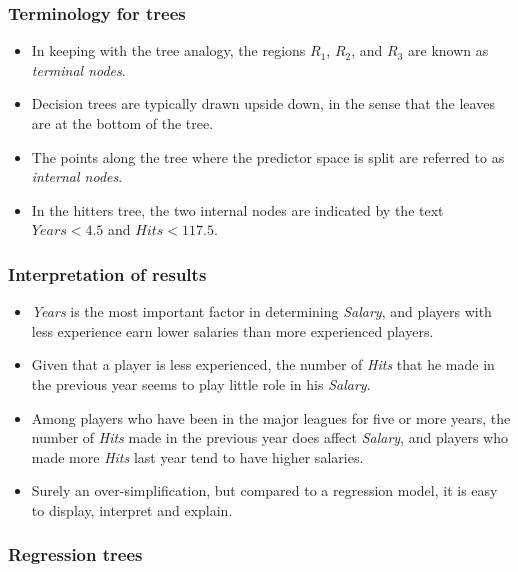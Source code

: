 \documentclass{beamer}
\begin{document}
\begin{frame}\frametitle{Terminology for trees}
	\begin{itemize}
	  \item In keeping with the tree analogy, the regions $R_1$, $R_2$, and
$R_3$ are known as \textit{terminal nodes}.
\vspace*{0.2cm}
\item Decision trees are typically drawn upside down, in the
sense that the leaves are at the bottom of the tree.
\vspace*{0.2cm}
\item The points along the tree where the predictor space is split
are referred to as \textit{internal nodes}.
\vspace*{0.2cm}
\item In the hitters tree, the two internal nodes are indicated by
the text $Years<4.5$ and $Hits<117.5$.
	\end{itemize}
\end{frame}


\begin{frame}\frametitle{Interpretation of results}
	\begin{itemize}
	  \item \textit{Years} is the most important factor in determining \textit{Salary},
and players with less experience earn lower salaries than
more experienced players.
\vspace*{0.2cm}
\item Given that a player is less experienced, the number of \textit{Hits}
that he made in the previous year seems to play little role
in his \textit{Salary}.
\vspace*{0.2cm}
\item Among players who have been in the major leagues for
five or more years, the number of \textit{Hits} made in the
previous year does affect \textit{Salary}, and players who made
more \textit{Hits} last year tend to have higher salaries.
\vspace*{0.2cm}
\item Surely an over-simplification, but compared to a regression
model, it is easy to display, interpret and explain.
	\end{itemize}
\end{frame}






\subsubsection{Regression trees}
\end{document}
